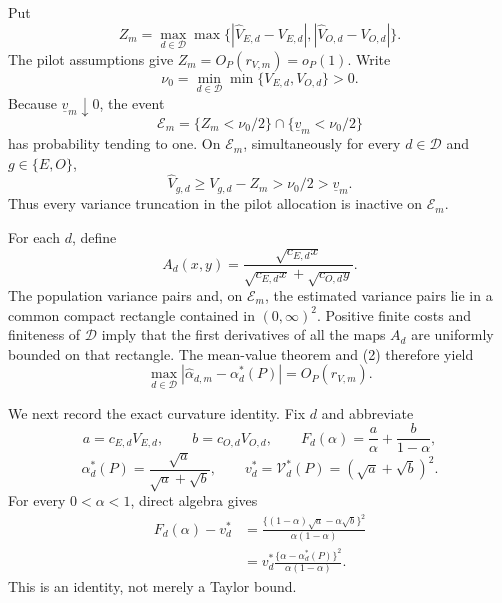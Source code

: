 Put
\[
 Z_m=\max_{d\in\mathcal D}\max\bigl\{
 |\widehat V_{E,d}-V_{E,d}|,
 |\widehat V_{O,d}-V_{O,d}|\bigr\}.
\]
The pilot assumptions give \(Z_m=O_P(r_{V,m})=o_P(1)\).  Write
\[
 \nu_0=\min_{d\in\mathcal D}\min\{V_{E,d},V_{O,d}\}>0.
\]
Because \(\underline v_m\downarrow0\), the event
\[
 \mathcal E_m
 =\{Z_m<\nu_0/2\}\cap\{\underline v_m<\nu_0/2\}                 \tag{1}
\]
has probability tending to one.  On \(\mathcal E_m\), simultaneously for every \(d\in\mathcal D\) and \(g\in\{E,O\}\),
\[
 \widehat V_{g,d}\ge V_{g,d}-Z_m>\nu_0/2>\underline v_m.          \tag{2}
\]
Thus every variance truncation in the pilot allocation is inactive on \(\mathcal E_m\).

For each \(d\), define
\[
 A_d(x,y)=
 \frac{\sqrt{c_{E,d}x}}
 {\sqrt{c_{E,d}x}+\sqrt{c_{O,d}y}}.
\]
The population variance pairs and, on \(\mathcal E_m\), the estimated variance pairs lie in a common compact rectangle contained in \((0,\infty)^2\).  Positive finite costs and finiteness of \(\mathcal D\) imply that the first derivatives of all the maps \(A_d\) are uniformly bounded on that rectangle.  The mean-value theorem and (2) therefore yield
\[
 \max_{d\in\mathcal D}
 |\widehat\alpha_{d,m}-\alpha_d^*(P)|
 =O_P(r_{V,m}).                                                     \tag{3}
\]

We next record the exact curvature identity.  Fix \(d\) and abbreviate
\[
 a=c_{E,d}V_{E,d},\qquad b=c_{O,d}V_{O,d},
 \qquad
 F_d(\alpha)=\frac a\alpha+\frac b{1-\alpha},
\]
\[
 \alpha_d^*(P)=\frac{\sqrt a}{\sqrt a+\sqrt b},
 \qquad
 v_d^*=\mathcal V_d^*(P)=(\sqrt a+\sqrt b)^2.
\]
For every \(0<\alpha<1\), direct algebra gives
\[
\begin{aligned}
 F_d(\alpha)-v_d^*
 &=\frac{\{(1-\alpha)\sqrt a-\alpha\sqrt b\}^2}
 {\alpha(1-\alpha)}\\
 &=v_d^*\frac{\{\alpha-\alpha_d^*(P)\}^2}
 {\alpha(1-\alpha)}.                                               \tag{4}
\end{aligned}
\]
This is an identity, not merely a Taylor bound.

